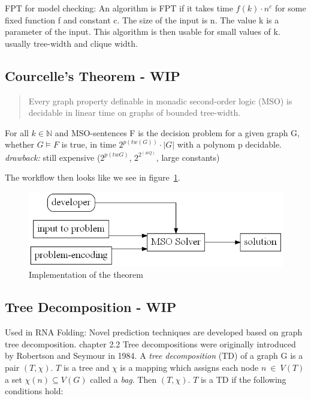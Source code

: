 \documentclass[a4paper, 12pt, bibliography=totoc]{scrartcl}
\begin{document}
FPT for model checking:
An algorithm is FPT if it takes time $f(k)\cdot n^{c}$ for some fixed function f and constant c. The size of the input is n. 
The value k is a parameter of the input. 
This algorithm is then usable for small values of k. usually tree-width and clique width.

\subsection{Courcelle's Theorem - WIP}
\begin{quotation}
	Every graph property definable in monadic second-order logic (MSO) is decidable in linear time on graphs of bounded tree-width. \cite{Courcelle2012}
\end{quotation}

\noindent
For all $k \in \mathbb{N}$ and MSO-sentences F is the decision problem for a given graph G, whether $G \models F$ is true, in time $2^{p(tw(G))} \cdot |G|$ with a polynom p decidable.
\emph{drawback:} still expensive ($2^{p(tw G)}$, $2^{2^{(\#Q)}}$, large constants) \smallskip 

The workflow then looks like we see in figure~\ref{fig:UsageCourcelle}.

\begin{figure}[H]
	\includegraphics[height=0.2\textheight]{images/UsageCourcelle.gv.png}
	\caption{Implementation of the theorem}
	\label{fig:UsageCourcelle}
\end{figure}

\subsection{Tree Decomposition - WIP}
Used in RNA Folding: Novel prediction techniques are developed based on graph tree decomposition. \cite{BioInfoTD1970}
\cite{DiplomarbeitZisser}chapter 2.2
Tree decompositions were originally introduced by Robertson and Seymour \cite{ROBERTSON198449} in 1984.
A \textit{tree decomposition} (TD) of a graph G is a pair $(T, \chi)$. $T$ is a tree and $\chi$ is a mapping which assigns each node $n~\in~V(T)$ 
a set $\chi(n) \subseteq V(G)$ called a \textit{bag}. Then $(T, \chi)$. $T$ is a TD if the following conditions hold:
\end{document}
